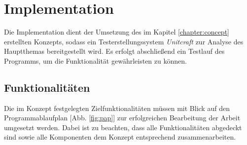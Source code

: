 \chapter{Implementation}\label{chapter:impl}
Die Implementation dient der Umsetzung des im Kapitel \ref{chapter:concept} erstellten Konzepts, sodass ein Testerstellungssystem \textit{Unitcraft} zur Analyse des Hauptthemas bereitgestellt wird. Es erfolgt abschließend ein Testlauf des Programms, um die Funktionalität gewährleisten zu können.

\section{Funktionalitäten}
Die im Konzept festgelegten Zielfunktionalitäten müssen mit Blick auf den Programmablaufplan [Abb. \ref{fig:pap}] zur erfolgreichen Bearbeitung der Arbeit umgesetzt werden. Dabei ist zu beachten, dass alle Funktionalitäten abgedeckt sind sowie alle Komponenten dem Konzept entsprechend zusammenarbeiten.
